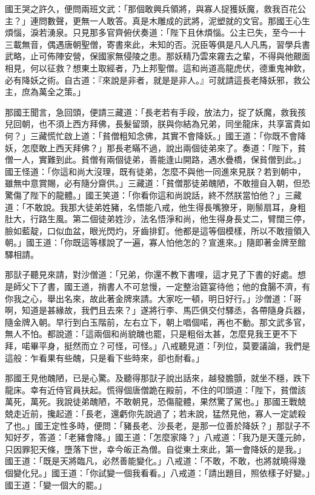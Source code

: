 國王哭之許久，便問兩班文武：「那個敢興兵領將，與寡人捉獲妖魔，救我百花公主？」連問數聲，更無一人敢答。真是木雕成的武將，泥塑就的文官。那國王心生煩惱，淚若湧泉。只見那多官齊俯伏奏道：「陛下且休煩惱。公主已失，至今一十三載無音，偶遇唐朝聖僧，寄書來此，未知的否。況臣等俱是凡人凡馬，習學兵書武略，止可佈陣安營，保國家無侵陵之患。那妖精乃雲來霧去之輩，不得與他覿面相見，何以征救？想東土取經者，乃上邦聖僧。這和尚道高龍虎伏，德重鬼神欽，必有降妖之術。自古道：『來說是非者，就是是非人。』可就請這長老降妖邪，救公主，庶為萬全之策。」

那國王聞言，急回頭，便請三藏道：「長老若有手段，放法力，捉了妖魔，救我孩兒回朝，也不須上西方拜佛，長髮留頭，朕與你結為兄弟，同坐龍床，共享富貴如何？」三藏慌忙啟上道：「貧僧粗知念佛，其實不會降妖。」國王道：「你既不會降妖，怎麼敢上西天拜佛？」那長老瞞不過，說出兩個徒弟來了。奏道：「陛下，貧僧一人，實難到此。貧僧有兩個徒弟，善能逢山開路，遇水疊橋，保貧僧到此。」國王怪道：「你這和尚大沒理，既有徒弟，怎麼不與他一同進來見朕？若到朝中，雖無中意賞賜，必有隨分齋供。」三藏道：「貧僧那徒弟醜陋，不敢擅自入朝，但恐驚傷了陛下的龍體。」國王笑道：「你看你這和尚說話，終不然朕當怕他？」三藏道：「不敢說。我那大徒弟姓豬，名悟能八戒，他生得長嘴獠牙，剛鬃扇耳，身粗肚大，行路生風。第二個徒弟姓沙，法名悟淨和尚，他生得身長丈二，臂闊三停，臉如藍靛，口似血盆，眼光閃灼，牙齒排釘。他都是這等個模樣，所以不敢擅領入朝。」國王道：「你既這等樣說了一遍，寡人怕他怎的？宣進來。」隨即著金牌至館驛相請。

那獃子聽見來請，對沙僧道：「兄弟，你還不教下書哩，這才見了下書的好處。想是師父下了書，國王道，捎書人不可怠慢，一定整治筵宴待他；他的食腸不濟，有你我之心，舉出名來，故此著金牌來請。大家吃一頓，明日好行。」沙僧道：「哥啊，知道是甚緣故，我們且去來？」遂將行李、馬匹俱交付驛丞，各帶隨身兵器，隨金牌入朝。早行到白玉階前，左右立下，朝上唱個喏，再也不動。那文武多官，無人不怕。都說道：「這兩個和尚貌醜也罷，只是粗俗太甚，怎麼見我王更不下拜，喏畢平身，挺然而立？可怪，可怪。」八戒聽見道：「列位，莫要議論，我們是這般：乍看果有些醜，只是看下些時來，卻也耐看。」

那國王見他醜陋，已是心驚。及聽得那獃子說出話來，越發膽顫，就坐不穩，跌下龍床。幸有近侍官員扶起。慌得個唐僧跪在殿前，不住的叩頭道：「陛下，貧僧該萬死，萬死。我說徒弟醜陋，不敢朝見，恐傷龍體，果然驚了駕也。」那國王戰兢兢走近前，攙起道：「長老，還虧你先說過了；若未說，猛然見他，寡人一定諕殺了也。」國王定性多時，便問：「豬長老、沙長老，是那一位善於降妖？」那獃子不知好歹，答道：「老豬會降。」國王道：「怎麼家降？」八戒道：「我乃是天蓬元帥，只因罪犯天條，墮落下世，幸今皈正為僧。自從東土來此，第一會降妖的是我。」國王道：「既是天將臨凡，必然善能變化。」八戒道：「不敢，不敢，也將就曉得幾個變化兒。」國王道：「你試變一個我看看。」八戒道：「請出題目，照依樣子好變。」國王道：「變一個大的罷。」

